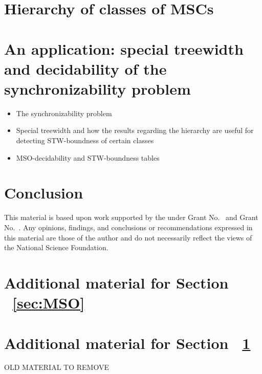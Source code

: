 \documentclass[acmsmall,review,anonymous,screen]{acmart}\settopmatter{printfolios=true,printccs=false,printacmref=true}
\begin{document}
\section{Hierarchy of classes of MSCs} \label{sec:hierarchy}



\section{An application: special treewidth and decidability of the synchronizability problem} \label{sec:checking}
\begin{itemize}
  \item The synchronizability problem
  \item Special treewidth and how the results regarding the hierarchy are useful for detecting STW-boundness of certain classes
  \item MSO-decidability and STW-boundness tables
\end{itemize}



\section{Conclusion}\label{sec:conc}

\begin{acks}                            %
  This material is based upon work supported by the
   under Grant
  No.~ and Grant
  No.~.  Any opinions, findings, and
  conclusions or recommendations expressed in this material are those
  of the author and do not necessarily reflect the views of the
  National Science Foundation.
\end{acks}







\appendix

\section{Additional material for Section ~\ref{sec:MSO}}
\label{apx:MSO}


\section{Additional material for Section ~\ref{sec:hierarchy}}
\label{apx:hierarchy}




\newpage
OLD MATERIAL TO REMOVE




\end{document}
